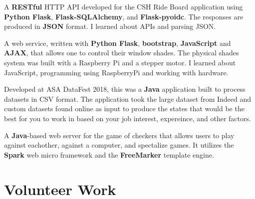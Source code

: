 \documentclass[]{deedy-resume-openfont}
\begin{document}
\begin{minipage}[t]{0.66\textwidth}
A \textbf{RESTful} HTTP API developed for the CSH Ride Board application using \textbf{Python Flask}, \textbf{Flask-SQLAlchemy}, and \textbf{Flask-pyoidc}. The responses are produced in \textbf{JSON} format. I learned about APIs and parsing JSON.
\sectionsep

A web service, written with \textbf{Python Flask}, \textbf{bootstrap}, \textbf{JavaScript} and \textbf{AJAX}, that allows one to control their window shades. The physical shades system was built with a Raspberry Pi and a stepper motor. I learned about JavaScript, programming using RaspberryPi and working with hardware.
\sectionsep

\location{}
Developed at ASA DataFest 2018, this was a \textbf{Java} application built to process datasets in CSV format.
The application took the large dataset from Indeed and custom datasets found online as input to produce the states that would be the best for you to work in based on your job interest, expereince, and other factors.
\sectionsep

\location{}
A \textbf{Java}-based web server for the game of checkers that allows users to play against eachother, against a computer, and spectalize games. It utilizes the \textbf{Spark} web micro framework and the \textbf{FreeMarker} template engine.
\sectionsep



\section{Volunteer Work}

\sectionsep


\end{minipage}
\end{document}
